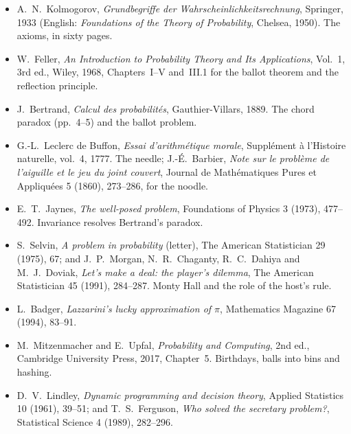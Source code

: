 \begin{itemize}
\item A.~N.~Kolmogorov, \emph{Grundbegriffe der Wahrscheinlichkeitsrechnung}, Springer, 1933 (English:
\emph{Foundations of the Theory of Probability}, Chelsea, 1950). The axioms, in sixty pages.
\item W.~Feller, \emph{An Introduction to Probability Theory and Its Applications}, Vol.~1, 3rd ed., Wiley, 1968,
Chapters~I--V and~III.1 for the ballot theorem and the reflection principle.
\item J.~Bertrand, \emph{Calcul des probabilités}, Gauthier-Villars, 1889. The chord paradox (pp.~4--5) and the
ballot problem.
\item G.-L.~Leclerc de Buffon, \emph{Essai d'arithmétique morale}, Supplément à l'Histoire naturelle, vol.~4, 1777.
The needle; J.-É.~Barbier, \emph{Note sur le problème de l'aiguille et le jeu du joint couvert}, Journal de
Mathématiques Pures et Appliquées 5 (1860), 273--286, for the noodle.
\item E.~T.~Jaynes, \emph{The well-posed problem}, Foundations of Physics 3 (1973), 477--492. Invariance resolves
Bertrand's paradox.
\item S.~Selvin, \emph{A problem in probability} (letter), The American Statistician 29 (1975), 67; and
J.~P.~Morgan, N.~R.~Chaganty, R.~C.~Dahiya and M.~J.~Doviak, \emph{Let's make a deal: the player's dilemma},
The American Statistician 45 (1991), 284--287. Monty Hall and the role of the host's rule.
\item L.~Badger, \emph{Lazzarini's lucky approximation of $\pi$}, Mathematics Magazine 67 (1994), 83--91.
\item M.~Mitzenmacher and E.~Upfal, \emph{Probability and Computing}, 2nd ed., Cambridge University Press, 2017,
Chapter~5. Birthdays, balls into bins and hashing.
\item D.~V.~Lindley, \emph{Dynamic programming and decision theory}, Applied Statistics 10 (1961), 39--51; and
T.~S.~Ferguson, \emph{Who solved the secretary problem?}, Statistical Science 4 (1989), 282--296.
\end{itemize}
